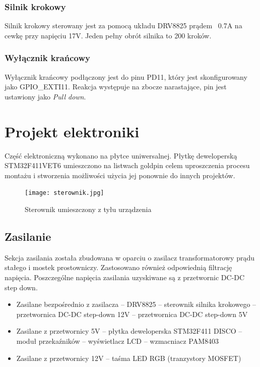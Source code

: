 \documentclass[10pt, a4paper]{article}
\begin{document}
\subsubsection{Silnik krokowy}
Silnik krokowy sterowany jest za pomocą układu DRV8825 prądem ~0.7A na cewkę przy napięciu 17V. Jeden pełny obrót silnika to 200 kroków. 

\subsubsection{Wyłącznik krańcowy}
Wyłącznik krańcowy podłączony jest do pinu PD11, który jest skonfigurowany jako GPIO{\_}EXTI11. Reakcja występuje na zbocze narastające, pin jest ustawiony jako \emph{Pull down}. 



\section{Projekt elektroniki}


Część elektroniczną wykonano na płytce uniwersalnej. Płytkę deweloperską STM32F411VET6 umieszczono na listwach goldpin celem uproszczenia procesu montażu i stworzenia możliwości użycia jej ponownie do innych projektów. 

\begin{figure}[H]
	\centering
	\texttt{[image: sterownik.jpg]}
	\caption{Sterownik umieszczony z tyłu urządzenia}
	\label{fig:Sterownik}
\end{figure}
\newpage
\subsection{Zasilanie}

Sekcja zasilania została zbudowana w oparciu o zasilacz transformatorowy prądu stałego i mostek prostowniczy. Zastosowano również odpowiednią filtrację napięcia. Poszczególne napięcia zasilania uzyskiwane są z przetwornic DC-DC step down.

\begin{itemize}
    \item Zasilane bezpośrednio z zasilacza
    \subitem -- DRV8825 -- sterownik silnika krokowego
    \subitem -- przetwornica DC-DC step-down 12V
    \subitem -- przetwornica DC-DC step-down 5V
    
    \item Zasilane z przetwornicy 5V
    \subitem -- płytka deweloperska STM32F411 DISCO
    \subitem -- moduł przekaźników
    \subitem -- wyświetlacz LCD
    \subitem -- wzmacniacz PAM8403
    
    \item Zasilane z przetwornicy 12V
    \subitem -- taśma LED RGB (tranzystory MOSFET)
    
\end{itemize}
\end{document}
